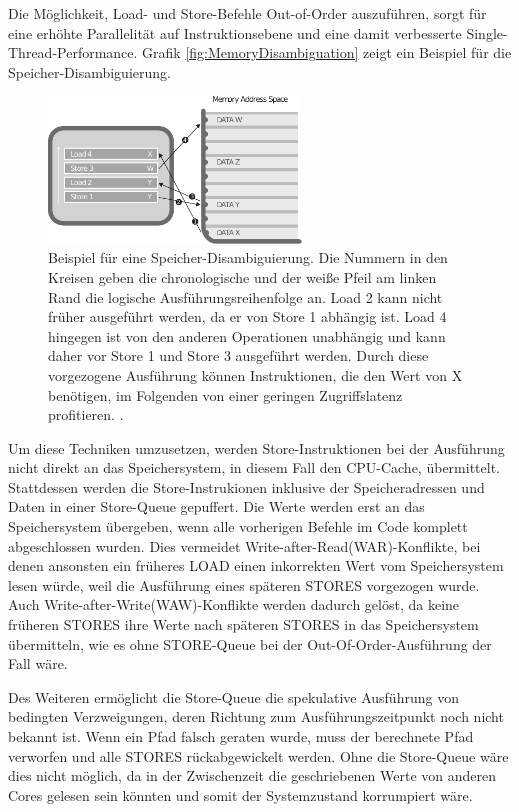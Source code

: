 Die Möglichkeit, Load- und Store-Befehle Out-of-Order auszuführen, sorgt für eine erhöhte Parallelität auf Instruktionsebene und eine damit verbesserte Single-Thread-Performance.
Grafik \ref{fig:MemoryDisambiguation} zeigt ein Beispiel für die Speicher-Disambiguierung. 

\label{fig:MemoryDisambiguation}
\begin{figure}[h]
\centering
\includegraphics[width=0.6\textwidth]{methods/grayscale_memory_disambiguation.pdf}
\caption{Beispiel für eine Speicher-Disambiguierung. Die Nummern in den Kreisen geben die chronologische und der weiße Pfeil am linken Rand die logische Ausführungsreihenfolge an. Load 2 kann nicht früher ausgeführt werden, da er von Store 1 abhängig ist. Load 4 hingegen ist von den anderen Operationen unabhängig und kann daher vor Store 1 und Store 3 ausgeführt werden. Durch diese vorgezogene Ausführung können Instruktionen, die den Wert von X benötigen, im Folgenden von einer geringen Zugriffslatenz profitieren. \cite{CacheAssoWiki}.}
\end{figure}

Um diese Techniken umzusetzen, werden Store-Instruktionen bei der Ausführung nicht direkt an das Speichersystem, in diesem Fall den CPU-Cache, übermittelt.
Stattdessen werden die Store-Instrukionen inklusive der Speicheradressen und Daten in einer Store-Queue gepuffert.
Die Werte werden erst an das Speichersystem übergeben, wenn alle vorherigen Befehle im Code komplett abgeschlossen wurden.
Dies vermeidet Write-after-Read(WAR)-Konflikte, bei denen ansonsten ein früheres LOAD einen inkorrekten Wert vom Speichersystem lesen würde, weil die Ausführung eines späteren STORES vorgezogen wurde.
Auch Write-after-Write(WAW)-Konflikte werden dadurch gelöst, da keine früheren STORES ihre Werte nach späteren STORES in das Speichersystem übermitteln, wie es ohne STORE-Queue bei der Out-Of-Order-Ausführung der Fall wäre. 

Des Weiteren ermöglicht die Store-Queue die spekulative Ausführung von bedingten Verzweigungen, deren Richtung zum Ausführungszeitpunkt noch nicht bekannt ist.
Wenn ein Pfad falsch geraten wurde, muss der berechnete Pfad verworfen und alle STORES rückabgewickelt werden.
Ohne die Store-Queue wäre dies nicht möglich, da in der Zwischenzeit die geschriebenen Werte von anderen Cores gelesen sein könnten und somit der Systemzustand korrumpiert wäre.

